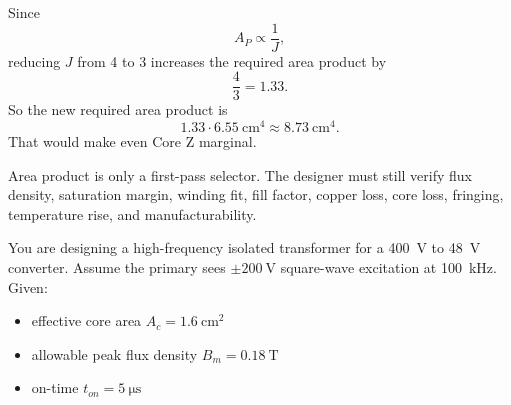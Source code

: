 \begin{solutionblock}
    Since
    \begin{equation}
        A_P \propto \frac{1}{J},
    \end{equation}
    reducing $J$ from 4 to 3 increases the required area product by
    \begin{equation}
        \frac{4}{3} = 1.33.
    \end{equation}
    So the new required area product is
    \begin{equation}
        1.33 \cdot  \SI{6.55}{\centi\meter^4} \approx \SI{8.73}{\centi\meter^4}.
    \end{equation}
    That would make even Core Z marginal.
\end{solutionblock}

\begin{solutionblock}
    Area product is only a first-pass selector. The designer must still verify flux density, saturation margin, winding fit, fill factor, copper loss, core loss, fringing, temperature rise, and manufacturability.
\end{solutionblock}



You are designing a high-frequency isolated transformer for a \SI{400}{\volt} to \SI{48}{\volt} converter.
Assume the primary sees $\pm \SI{200}{\volt}$ square-wave excitation at \SI{100}{\kilo\hertz}. \\

Given:
\begin{itemize}
    \setlength{\itemsep}{-2pt} %
    \setlength{\parskip}{-2pt} %
    \item effective core area $A_c = \SI{1.6}{\centi\meter\squared}$
    \item allowable peak flux density $B_m = \SI{0.18}{\tesla}$
    \item on-time $t_{on}=\SI{5}{\micro\second}$
\end{itemize}

